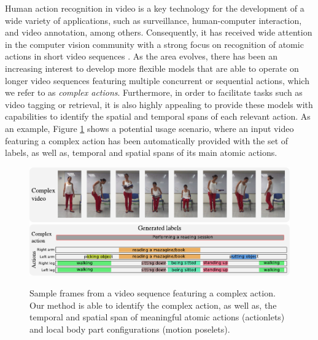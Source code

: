 Human action recognition in video is a key technology for the development of a
wide variety of applications, such as surveillance, human-computer interaction,
and video annotation, among others. Consequently, it has received wide attention
in the computer vision community with a strong focus on recognition of atomic
actions in short video sequences
\cite{Aggarwal2011,Poppe2010,vishwakarma2013survey,weinland2011survey}.
As the area
evolves, there has been an increasing interest to develop more
flexible models that are able to operate on longer video sequences featuring
multiple concurrent or sequential actions, which we refer to as
\textit{complex actions}. Furthermore, in order to facilitate tasks such as
video tagging or retrieval, it is also highly appealing to provide these models
with capabilities to identify the spatial and temporal spans of each relevant
action. As an example, Figure \ref{fig:frontfigure} shows a potential usage
scenario, where an input video featuring a complex action has been automatically
provided with the set of labels, as well as, temporal and
spatial spans of its main atomic actions.

\begin{figure}[t]
\begin{center} \label{fig:frontfigure}
\includegraphics[width=0.98\linewidth]{Fig/portada.pdf}
\vspace{-0.5cm}
\end{center}
\caption{\footnotesize
Sample frames from a video sequence featuring a complex action. 
Our method is able to identify the complex action, as well as, the temporal and 
spatial span of meaningful atomic actions (actionlets) and local body part 
configurations (motion poselets).}
\vspace{-0.5cm}
\end{figure}


